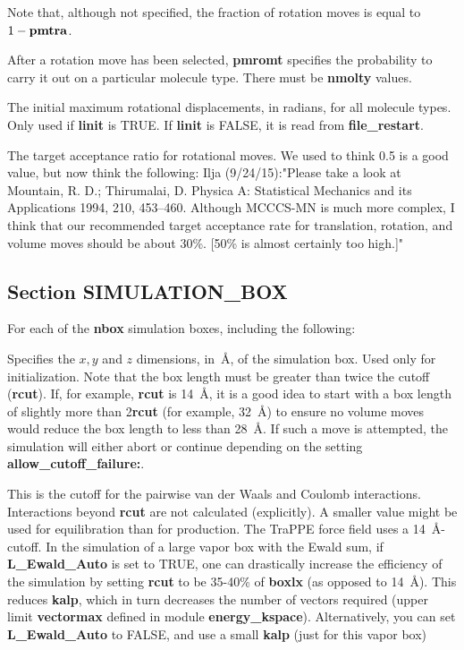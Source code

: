 \documentclass[12pt,letterpaper]{article}
\begin{document}
Note that, although not specified, the fraction of rotation
moves is equal to $1 - {\bf pmtra}$.

 After a rotation move has been
selected, {\bf pmromt} specifies the probability to carry it
out on a particular molecule type. There must be {\bf
  nmolty} values.

 The initial maximum rotational
displacements, in radians, for all molecule types. Only used
if {\bf linit} is TRUE. If {\bf linit} is FALSE, it is read
from {\bf file\_restart}.

 The target acceptance ratio for
rotational moves. We used to think 0.5 is a good value,
but now think the following:
Ilja (9/24/15):"Please take a look at 
Mountain, R. D.; Thirumalai, D. Physica A: Statistical Mechanics and its Applications
1994, 210, 453–460.
Although MCCCS-MN is much more complex, I think that our
recommended target acceptance rate for translation, rotation,
and volume moves should be about 30\%.  [50\% is almost certainly too high.]"



\subsection{Section \textbf{SIMULATION\_BOX}}
For each of the \textbf{nbox} simulation boxes, including
the following:

 Specifies the $x, y$ and
$z$ dimensions, in~\AA, of the simulation box. Used only for
initialization. Note that the box length must be greater
than twice the cutoff ({\bf rcut}). If, for example, {\bf
  rcut} is 14~\AA, it is a good idea to start with a box
length of slightly more than 2{\bf rcut} (for example,
32~\AA) to ensure no volume moves would reduce the box
length to less than 28~\AA. If such a move is attempted, the
simulation will either abort or continue depending on the
setting {\bf allow\_cutoff\_failure:}.

 This is the cutoff for the pairwise van
der Waals and Coulomb interactions. Interactions beyond {\bf
  rcut} are not calculated (explicitly). A smaller value
might be used for equilibration than for production. The
TraPPE force field uses a 14~\AA-cutoff. In the simulation
of a large vapor box with the Ewald sum, if {\bf
  L\_Ewald\_Auto} is set to TRUE, one can drastically
increase the efficiency of the simulation by setting
{\bf rcut} to be 35-40\% of {\bf boxlx} (as opposed to 14~\AA). This reduces {\bf
  kalp}, which in turn decreases the number of vectors
required (upper limit {\bf vectormax} defined in module {\bf
  energy\_kspace}). Alternatively, you can set {\bf
  L\_Ewald\_Auto} to FALSE, and use a small {\bf kalp} (just
for this vapor box)
\end{document}
